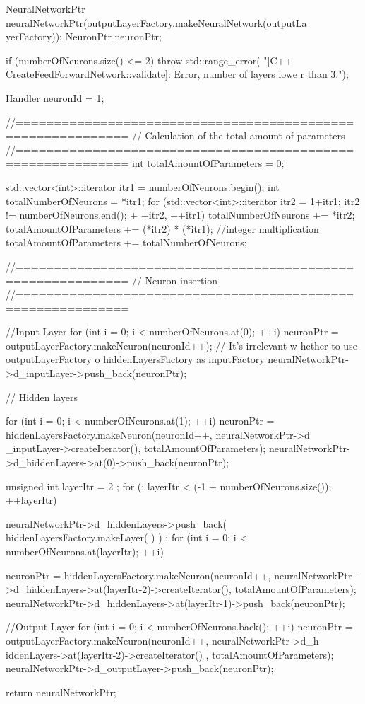 \begin{DoxyCode}
{
  NeuralNetworkPtr neuralNetworkPtr(outputLayerFactory.makeNeuralNetwork(outputLa
      yerFactory));
  NeuronPtr neuronPtr;

  if (numberOfNeurons.size() <= 2)
    {
      throw std::range_error(
          "[C++ CreateFeedForwardNetwork::validate]: Error, number of layers lowe
      r than 3.");
    }

  Handler neuronId = 1;

  //============================================================
  // Calculation of the total amount of parameters
  //============================================================
  int totalAmountOfParameters = 0;

  std::vector<int>::iterator itr1 = numberOfNeurons.begin();
  int totalNumberOfNeurons = *itr1;
  for (std::vector<int>::iterator itr2 = 1+itr1; itr2 != numberOfNeurons.end(); +
      +itr2, ++itr1)
    {
      totalNumberOfNeurons += *itr2;
      totalAmountOfParameters += (*itr2) * (*itr1); //integer multiplication
    }
  totalAmountOfParameters += totalNumberOfNeurons;


  //============================================================
  // Neuron insertion
  //============================================================

  //Input Layer
  for (int i = 0; i < numberOfNeurons.at(0); ++i)
    {
      neuronPtr = outputLayerFactory.makeNeuron(neuronId++); // It's irrelevant w
      hether to use outputLayerFactory o hiddenLayersFactory as inputFactory
      neuralNetworkPtr->d_inputLayer->push_back(neuronPtr);
    }


  // Hidden layers

  for (int i = 0; i < numberOfNeurons.at(1); ++i)
     {
       neuronPtr = hiddenLayersFactory.makeNeuron(neuronId++, neuralNetworkPtr->d
      _inputLayer->createIterator(), totalAmountOfParameters);
       neuralNetworkPtr->d_hiddenLayers->at(0)->push_back(neuronPtr);
     }

  unsigned int layerItr = 2 ;
  for (; layerItr < (-1 + numberOfNeurons.size()); ++layerItr)
    {
      neuralNetworkPtr->d_hiddenLayers->push_back( hiddenLayersFactory.makeLayer(
      ) ) ;
      for (int i = 0; i < numberOfNeurons.at(layerItr); ++i)
        {
          neuronPtr = hiddenLayersFactory.makeNeuron(neuronId++, neuralNetworkPtr
      ->d_hiddenLayers->at(layerItr-2)->createIterator(), totalAmountOfParameters);
          neuralNetworkPtr->d_hiddenLayers->at(layerItr-1)->push_back(neuronPtr);
      
        }
    }


  //Output Layer
  for (int i = 0; i < numberOfNeurons.back(); ++i)
    {
      neuronPtr = outputLayerFactory.makeNeuron(neuronId++, neuralNetworkPtr->d_h
      iddenLayers->at(layerItr-2)->createIterator() , totalAmountOfParameters);
      neuralNetworkPtr->d_outputLayer->push_back(neuronPtr);
    }

  return neuralNetworkPtr;
}
\end{DoxyCode}


